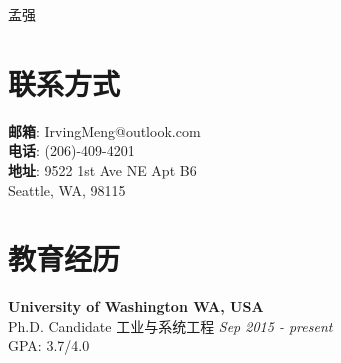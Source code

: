 \documentclass[margin,line,11pt]{resume}
\begin{document}
{\sc \Huge 孟强}

\begin{resume}



 
            \vspace{-0.5em}\section{\mysidestyle 联系方式}
    \textbf{邮箱}:\hspace{1.5em}  IrvingMeng@outlook.com \\
    \textbf{电话}: \hspace{1em} (206)-409-4201\\ 
    \textbf{地址}: \hspace{1.5em}9522 1st Ave NE Apt B6\\
     \hspace*{4.5em}Seattle, WA, 98115 


             \vspace{-0.5em}\section{\mysidestyle 教育经历}
     \textbf{University of Washington  \hfill WA, USA}\\
Ph.D. Candidate \quad  工业与系统工程 \hfill \textit{Sep 2015 - present}\\
 GPA: 3.7/4.0 


\end{resume}
\end{document}
